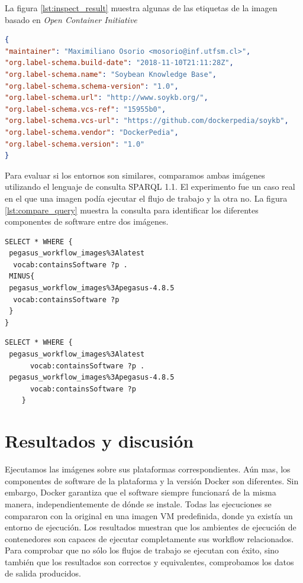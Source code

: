 La figura \ref{lst:inspect_result} muestra algunas de las etiquetas de la imagen basado en \textit{Open Container Initiative} 
\begin{lstlisting}[caption={Inspect image annotations},label={lst:inspect_result},language=json]
{
"maintainer": "Maximiliano Osorio <mosorio@inf.utfsm.cl>",
"org.label-schema.build-date": "2018-11-10T21:11:28Z",
"org.label-schema.name": "Soybean Knowledge Base",
"org.label-schema.schema-version": "1.0",
"org.label-schema.url": "http://www.soykb.org/",
"org.label-schema.vcs-ref": "15955b0",
"org.label-schema.vcs-url": "https://github.com/dockerpedia/soykb",
"org.label-schema.vendor": "DockerPedia",
"org.label-schema.version": "1.0"
}

\end{lstlisting}


Para evaluar si los entornos son similares, comparamos ambas imágenes utilizando el lenguaje de consulta SPARQL 1.1. El experimento fue un caso real en el que una imagen podía ejecutar el flujo de trabajo y la otra no. 
La figura \ref{lst:compare_query} muestra la consulta para identificar los diferentes componentes de software entre dos imágenes.

\begin{lstlisting}[caption={¿Cuáles son los diferentes componentes entre dos imágenes?},label={lst:compare_query},language=sparql]
SELECT * WHERE {
 pegasus_workflow_images%3Alatest
  vocab:containsSoftware ?p .
 MINUS{
 pegasus_workflow_images%3Apegasus-4.8.5
  vocab:containsSoftware ?p   
 }
}
\end{lstlisting}

\begin{lstlisting}[caption={¿Cuáles son los componentes que comparten entre dos imágenes?},label={lst:compare_query},language=sparql]
SELECT * WHERE {
 pegasus_workflow_images%3Alatest
      vocab:containsSoftware ?p .
 pegasus_workflow_images%3Apegasus-4.8.5
      vocab:containsSoftware ?p   
    }
    \end{lstlisting}
    
    
\section{Resultados y discusión}\label{s5.4}
Ejecutamos las imágenes sobre sus plataformas correspondientes. Aún mas, los componentes de software de la plataforma y la versión Docker son diferentes. Sin embargo, Docker garantiza que el software siempre funcionará de la misma manera, independientemente de dónde se instale.
Todas las ejecuciones se compararon con la original en una imagen VM predefinida, donde ya existía un entorno de ejecución.
Los resultados muestran que los ambientes de ejecución de contenedores son capaces de ejecutar completamente sus workflow relacionados. Para comprobar que no sólo los flujos de trabajo se ejecutan con éxito, sino también que los resultados son correctos y equivalentes, comprobamos los datos de salida producidos. 

